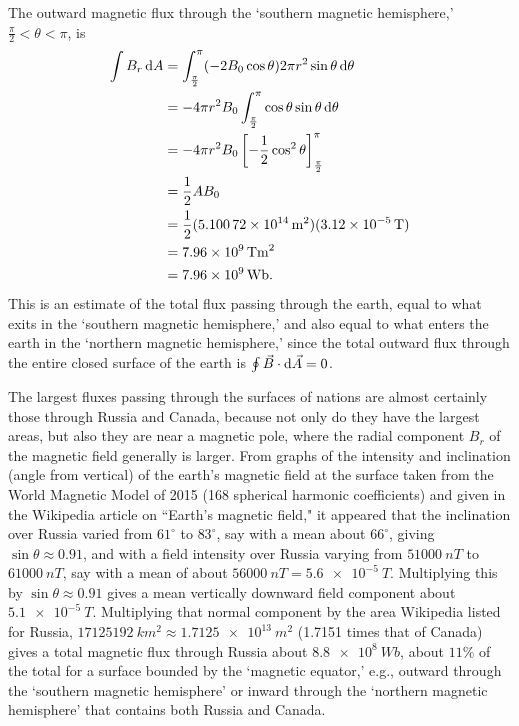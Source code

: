 The outward magnetic flux through the `southern magnetic hemisphere,' $\frac{\pi}{2} < \theta < \pi$, is 
\begin{align*}
\int B_r \operatorname{d\!} A &= \int_\frac{\pi}{2}^\pi (-2B_0 \cos \theta) 2\pi r^2 \sin\theta\operatorname{d\!}\theta \\
&= -4\pi r^2 B_0 \int_\frac{\pi}{2}^\pi \cos\theta\sin\theta\operatorname{d\!}\theta \\
&= -4\pi r^2 B_0 \left[  -\frac{1}{2}\cos^2\theta  \right]_\frac{\pi}{2}^\pi \\
&= \frac{1}{2} A B_0 \\
&= \frac{1}{2} (\SI{5.10072e14}{m^2})(\SI{3.12e-5}{T}) \\
&= \SI{7.96e9}{Tm^2} \\
&= \SI{7.96e9}{Wb}.
\end{align*}
This is an estimate of the total flux passing through the earth, equal to what exits in the `southern magnetic hemisphere,' and also equal to what enters the earth in the `northern magnetic hemisphere,' since the total outward flux through the entire closed surface of the earth is $\oint \vec{B} \cdot \operatorname{d\!} \vec{A} = 0$.

The largest fluxes passing through the surfaces of nations are almost certainly those through Russia and Canada, because not only do they have the largest areas, but also they are near a magnetic pole, where the radial component $B_r$ of the magnetic field generally is larger. From graphs of the intensity and inclination (angle from vertical) of the earth's magnetic field at the surface taken from the World Magnetic Model of 2015 (168 spherical harmonic coefficients) and given in the Wikipedia article on ``Earth's magnetic field," it appeared that the inclination over Russia varied from $61^\circ$ to $83^\circ$, say with a mean about $66^\circ$, giving $\sin\theta \approx 0.91$, and with a field intensity over Russia varying from $\SI{51000}{nT}$ to $\SI{61000}{nT}$, say with a mean of about $\SI{56000}{nT} = \SI{5.6e-5}{T}$. Multiplying this by $\sin\theta \approx 0.91$ gives a mean vertically downward field component about $\SI{5.1e-5}{T}$. Multiplying that normal component by the area Wikipedia listed for Russia, $\SI{17125192}{km^2} \approx \SI{1.7125e13}{m^2}$ (1.7151 times that of Canada) gives a total magnetic flux through Russia about $\SI{8.8e8}{Wb}$, about $11\%$ of the total for a surface bounded by the `magnetic equator,' e.g., outward through the `southern magnetic hemisphere' or inward through the `northern magnetic hemisphere' that contains both Russia and Canada.

